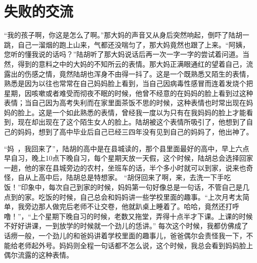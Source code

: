 \section{失败的交流}
\par{
“我的孩子啊，你这是怎么了啊。”那大妈的声音又从身后突然响起，倒吓了陆胡一跳，自己一溜烟的跑上山来，气都还没喘匀了，那大妈竟然也跟了上来。“阿姨，您听的懂我说的话吗？”陆胡听了那大妈说话后再一次一字一字的尝试着问道。当然，得到的意料之中的大妈的不知所云的表情。那大妈正满眼通红的望着自己，流露出的伤感之情，竟然陆胡也浑身不由得一抖了。这是一个既熟悉又陌生的表情，熟悉是因为以往也常常在自己妈妈脸上看到，当自己因病毒性感冒而连着发烧个把星期，因咳嗽或者难受而彻夜不眠的时候，他曾不经意的在妈妈的脸上看到过这种表情；当自己因为高考失利而在家里面茶饭不思的时候，这种表情也时常出现在妈妈的脸上。这是一个如此熟悉的表情，曾经我一度以为只有在我妈妈的脸上才能看到，现在却出现在了这个陌生女人的脸上。陆胡被这个表情所吸引了，他想到了自己的妈妈，想到了高中毕业后自己已经三四年没有见到自己的妈妈了，他出神了。
}
\par{
“妈~，我回来了”，陆胡的高中是在县城读的，那个县里面最好的高中，早上六点早自习，晚上10点下晚自习，每个星期天放一天假，这个时候，陆胡总会选择回家一趟，他的家在县城旁边的农村，坐班车的话，半个多小时就可以到家，说来也奇怪，自从上高中后，陆胡总是特想家。\wx
“胡伢回来了啊，来，去洗一下手吃饭！”印象中，每次自己到家的时候，妈妈第一句好像总是一句话，不管自己是几点到的家。吃饭的时候，自己总会和妈妈讲一些学校里面的趣事。“上次月考太简单，我旁边那人做完后老师不让交卷，他就趴桌上睡着了。哈哈，竟然还打呼噜！”，“上个星期下晚自习的时候，老数又拖堂，弄得十点半才下课。上课的时候不好好讲课，一到放学的时候就一个劲儿的恁讲。”\wx
每次这个时候，我都仿佛成了话痨一般，一个劲儿的和爸妈讲着学校里面的趣事儿，爸爸偶尔会责怪我一下，不能给老师起外号。妈妈则全程一句话都不怎么说，这个时候，我总会看到妈妈脸上偶尔流露的这种表情。
}
